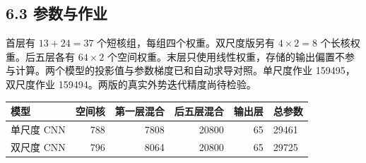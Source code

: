 \documentclass[UTF8,fontset=none,10pt,a4paper]{ctexart}
\begin{document}
\subsection*{6.3 参数与作业}
首层有 $13+24=37$ 个短核组，每组四个权重。双尺度版另有 $4\times2=8$ 个长核权重。后五层各有 $64\times2$ 个空间权重。末层只使用线性权重，存储的输出偏置不参与计算。两个模型的投影值与参数梯度已和自动求导对照。单尺度作业 159495，双尺度作业 159494。两版的真实外势迭代精度尚待检验。
\begin{center}\small
\begin{tabularx}{\linewidth}{@{}lrrrrX@{}}
\toprule
模型 & 空间核 & 第一层混合 & 后五层混合 & 输出层 & 总参数\\
\midrule
单尺度 CNN & 788 & 7808 & 20800 & 65 & 29461\\
双尺度 CNN & 796 & 8064 & 20800 & 65 & 29725\\
\bottomrule
\end{tabularx}
\end{center}

\clearpage
\end{document}
